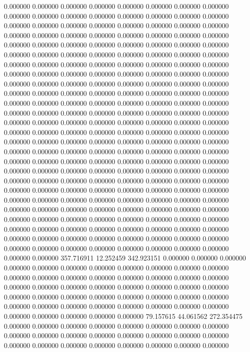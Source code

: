 0.000000 0.000000 0.000000
0.000000 0.000000 0.000000
0.000000 0.000000 0.000000
0.000000 0.000000 0.000000
0.000000 0.000000 0.000000
0.000000 0.000000 0.000000
0.000000 0.000000 0.000000
0.000000 0.000000 0.000000
0.000000 0.000000 0.000000
0.000000 0.000000 0.000000
0.000000 0.000000 0.000000
0.000000 0.000000 0.000000
0.000000 0.000000 0.000000
0.000000 0.000000 0.000000
0.000000 0.000000 0.000000
0.000000 0.000000 0.000000
0.000000 0.000000 0.000000
0.000000 0.000000 0.000000
0.000000 0.000000 0.000000
0.000000 0.000000 0.000000
0.000000 0.000000 0.000000
0.000000 0.000000 0.000000
0.000000 0.000000 0.000000
0.000000 0.000000 0.000000
0.000000 0.000000 0.000000
0.000000 0.000000 0.000000
0.000000 0.000000 0.000000
0.000000 0.000000 0.000000
0.000000 0.000000 0.000000
0.000000 0.000000 0.000000
0.000000 0.000000 0.000000
0.000000 0.000000 0.000000
0.000000 0.000000 0.000000
0.000000 0.000000 0.000000
0.000000 0.000000 0.000000
0.000000 0.000000 0.000000
0.000000 0.000000 0.000000
0.000000 0.000000 0.000000
0.000000 0.000000 0.000000
0.000000 0.000000 0.000000
0.000000 0.000000 0.000000
0.000000 0.000000 0.000000
0.000000 0.000000 0.000000
0.000000 0.000000 0.000000
0.000000 0.000000 0.000000
0.000000 0.000000 0.000000
0.000000 0.000000 0.000000
0.000000 0.000000 0.000000
0.000000 0.000000 0.000000
0.000000 0.000000 0.000000
0.000000 0.000000 0.000000
0.000000 0.000000 0.000000
0.000000 0.000000 0.000000
0.000000 0.000000 0.000000
0.000000 0.000000 0.000000
0.000000 0.000000 0.000000
0.000000 0.000000 0.000000
0.000000 0.000000 0.000000
0.000000 0.000000 0.000000
0.000000 0.000000 0.000000
0.000000 0.000000 0.000000
0.000000 0.000000 0.000000
0.000000 0.000000 0.000000
0.000000 0.000000 0.000000
0.000000 0.000000 0.000000
0.000000 0.000000 0.000000
0.000000 0.000000 0.000000
0.000000 0.000000 0.000000
0.000000 0.000000 0.000000
0.000000 0.000000 0.000000
357.716911 12.252459 342.923151
0.000000 0.000000 0.000000
0.000000 0.000000 0.000000
0.000000 0.000000 0.000000
0.000000 0.000000 0.000000
0.000000 0.000000 0.000000
0.000000 0.000000 0.000000
0.000000 0.000000 0.000000
0.000000 0.000000 0.000000
0.000000 0.000000 0.000000
0.000000 0.000000 0.000000
0.000000 0.000000 0.000000
0.000000 0.000000 0.000000
0.000000 0.000000 0.000000
0.000000 0.000000 0.000000
0.000000 0.000000 0.000000
0.000000 0.000000 0.000000
79.157615 44.061562 272.354475
0.000000 0.000000 0.000000
0.000000 0.000000 0.000000
0.000000 0.000000 0.000000
0.000000 0.000000 0.000000
0.000000 0.000000 0.000000
0.000000 0.000000 0.000000
0.000000 0.000000 0.000000
0.000000 0.000000 0.000000
